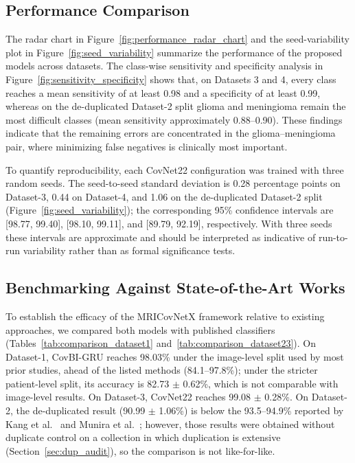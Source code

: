 \documentclass[a4paper,fleqn]{cas-sc}
\begin{document}
\subsection{Performance Comparison}

The radar chart in Figure~\ref{fig:performance_radar_chart} and the seed-variability plot in Figure~\ref{fig:seed_variability} summarize the performance of the proposed models across datasets. The class-wise sensitivity and specificity analysis in Figure~\ref{fig:sensitivity_specificity} shows that, on Datasets 3 and 4, every class reaches a mean sensitivity of at least 0.98 and a specificity of at least 0.99, whereas on the de-duplicated Dataset-2 split glioma and meningioma remain the most difficult classes (mean sensitivity approximately 0.88--0.90). These findings indicate that the remaining errors are concentrated in the glioma--meningioma pair, where minimizing false negatives is clinically most important.

To quantify reproducibility, each CovNet22 configuration was trained with three random seeds. The seed-to-seed standard deviation is 0.28 percentage points on Dataset-3, 0.44 on Dataset-4, and 1.06 on the de-duplicated Dataset-2 split (Figure~\ref{fig:seed_variability}); the corresponding 95\% confidence intervals are [98.77, 99.40], [98.10, 99.11], and [89.79, 92.19], respectively. With three seeds these intervals are approximate and should be interpreted as indicative of run-to-run variability rather than as formal significance tests.

\subsection{Benchmarking Against State-of-the-Art Works}

To establish the efficacy of the MRICovNetX framework relative to existing approaches, we compared both models with published classifiers (Tables~\ref{tab:comparison_dataset1} and~\ref{tab:comparison_dataset23}). On Dataset-1, CovBI-GRU reaches 98.03\% under the image-level split used by most prior studies, ahead of the listed methods (84.1--97.8\%); under the stricter patient-level split, its accuracy is 82.73 $\pm$ 0.62\%, which is not comparable with image-level results. On Dataset-3, CovNet22 reaches 99.08 $\pm$ 0.28\%. On Dataset-2, the de-duplicated result (90.99 $\pm$ 1.06\%) is below the 93.5--94.9\% reported by Kang et al.~\cite{R37} and Munira et al.~\cite{R28}; however, those results were obtained without duplicate control on a collection in which duplication is extensive (Section~\ref{sec:dup_audit}), so the comparison is not like-for-like.
\end{document}
